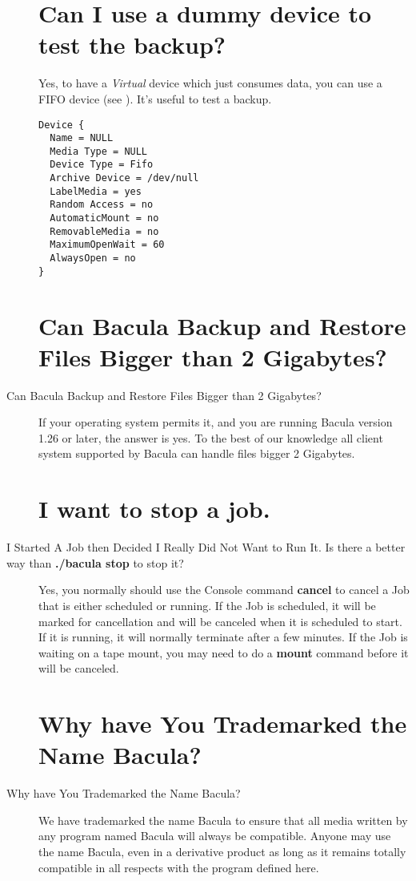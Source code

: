 \begin{description}
\label{testbackup}
\section{Can I use a dummy device to test the backup?}
   Yes, to have a {\sl Virtual} device which just consumes data, you can use a 
   FIFO device (see ).
   It's useful to test a backup.
\footnotesize
\begin{verbatim}
Device {
  Name = NULL
  Media Type = NULL
  Device Type = Fifo
  Archive Device = /dev/null
  LabelMedia = yes
  Random Access = no
  AutomaticMount = no
  RemovableMedia = no
  MaximumOpenWait = 60
  AlwaysOpen = no
}
\end{verbatim}
\normalsize

\label{bigfiles}
\section{Can Bacula Backup and Restore Files Bigger than 2 Gigabytes?}
\item [Can Bacula Backup and Restore Files Bigger than 2 Gigabytes?]
If your operating system permits it, and you are running Bacula version
1.26 or later, the answer is yes.  To the best of our knowledge all client
system supported by Bacula can handle files bigger 2 Gigabytes.

\label{cancel}
\section{I want to stop a job.}
\item [I Started A Job then Decided I Really Did Not Want to Run It. Is
   there  a better way than {\bf ./bacula stop} to stop it?]
   Yes, you normally should use the Console command {\bf cancel} to cancel
   a Job that is either scheduled or running.  If the Job is scheduled, it
   will be marked for cancellation and will be canceled when it is
   scheduled to start.  If it is running, it will normally terminate after
   a few minutes.  If the Job is waiting on a tape mount, you may need to
   do a {\bf mount} command before it will be canceled.

\label{trademark}
\section{Why have You Trademarked the Name Bacula?}
\item [Why have You Trademarked the Name
   Bacula\raisebox{.6ex}{{\footnotesize \textsuperscript{\textregistered}}}?]
We have trademarked the name Bacula to ensure that all media  written by any
program named Bacula will always be compatible. Anyone  may use the name
Bacula, even in a derivative product as long as it  remains totally compatible
in all respects with the program defined  here.


\end{description}

